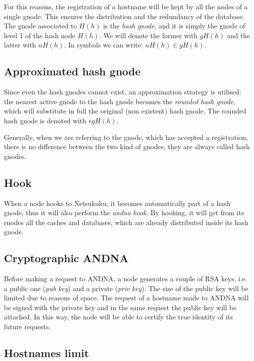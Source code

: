 \documentclass[a4paper]{article}
\begin{document}
For this reasons, the registration of a hostname will be kept by all the nodes
of a single gnode. This ensures the distribution and the redundancy of the
database. The gnode associated to $H(h)$ is the \emph{hash gnode}, and it is
simply the gnode of level 1 of the hash node $H(h)$. We will denote the former
with $gH(h)$ and the latter with $nH(h)$. In symbols we can write: $nH(h) \in
gH(h)$.

\subsection{Approximated hash gnode}
Since even the hash gnodes cannot exist, an approximation strategy is
utilised: the nearest active gnode to the hash gnode becomes the
\emph{rounded hash gnode}, which will substitute in full the original (non
existent) hash gnode. The rounded hash gnode is denoted with $rgH(h)$.

Generally, when we are referring to the gnode, which has accepted a
registration, there is no difference between the two kind of gnodes, they are
always called hash gnodes.

\subsection{Hook}

When a node hooks to Netsukuku, it becomes automatically part of a hash gnode,
thus it will also perform the \emph{andna hook}.
By hooking, it will get from its rnodes all the caches and databases, which
are already distributed inside its hash gnode.

\subsection{Cryptographic ANDNA}
  
Before making a request to ANDNA, a node generates a couple of RSA keys,
i.e. a public one (\emph{pub key}) and a private (\emph{priv key}). The size of the
public key will be limited due to reasons of space.
The request of a hostname made to ANDNA will be signed with the private key
and in the same request the public key will be attached.
In this way, the node will be able to certify the true identity of its
future requests.

\subsection{Hostnames limit}
\end{document}
